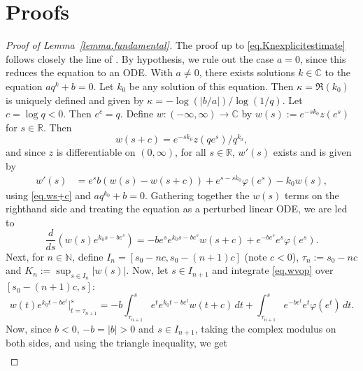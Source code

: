 \documentclass[a4paper,10pt,reqno]{amsart}
\numberwithin{equation}{section}
\theoremstyle{definition}
\theoremstyle{remark}
\DeclareMathOperator{\1}{\mathbbm 1}
\begin{document}
\section{Proofs}
\begin{proof}[Proof of Lemma~\ref{lemma.fundamental}]
The proof up to \eqref{eq.Knexplicitestimate} follows closely the line of \cite[Theorem 3(i)]{KatoMc}.
By hypothesis, we rule out the case $a=0$, since this reduces the equation to an ODE. With $a\neq 0$, there exists solutions $k\in \mathbb{C}$ to the equation $aq^k+b=0$. Let $k_0$ be any solution of this equation. Then $\kappa=\Re(k_0)$ is uniquely defined and given by $\kappa=-\log(|b/a|)/\log(1/q)$. Let $c=\log q<0$. Then $e^c=q$. Define $w:(-\infty,\infty)\to\mathbb{C}$ by 
$w(s):=e^{-sk_0} z(e^s)$ for $s\in \mathbb{R}$. Then 
\begin{equation} \label{eq.ws+c}
	w(s+c)=e^{-sk_0} z(qe^s)/q^{k_0},
\end{equation}
and since $z$ is differentiable on $(0,\infty)$, for all $s\in\mathbb{R}$, $w'(s)$ exists and is given by 
\begin{align*}
	w'(s)%
	&= e^s b(w(s)-w(s+c)) + e^{s-sk_0}\varphi(e^s)-k_0w(s),
\end{align*}
using \eqref{eq.ws+c} and $aq^{k_0}+b=0$. 
Gathering together the $w(s)$ terms on the righthand side and treating the equation as a perturbed linear ODE, we are led to 
\begin{equation} \label{eq.wvop}
	\frac{d}{ds}\left(w(s)e^{k_0s - be^s}\right)
	=-be^se^{k_0s-be^s}w(s+c)+e^{-be^s}e^s\varphi(e^s).
\end{equation}
Next, for $n\in \mathbb{N}$, define $I_n=[s_0-nc,s_0-(n+1)c]$ (note $c<0$), $\tau_n:=s_0-nc$ and $K_n:=\sup_{s\in I_n} |w(s)|$. 
Now, let $s\in I_{n+1}$ and integrate \eqref{eq.wvop} over $[s_0-(n+1)c,s]$:
\[%
w(t)e^{k_0 t - be^t}\big|_{t=\tau_{n+1}}^s
=-b\int_{\tau_{n+1}}^s e^t e^{k_0t-be^t}w(t+c)\,dt + \int_{\tau_{n+1}}^s e^{-be^t}e^t\varphi(e^t)\,dt.	
\]%
Now, since $b<0$, $-b=|b|>0$ and $s\in I_{n+1}$, taking the complex modulus on both sides, and using the triangle inequality, we get 
\begin{multline*}

\end{multline*}
\end{proof}
\end{document}
